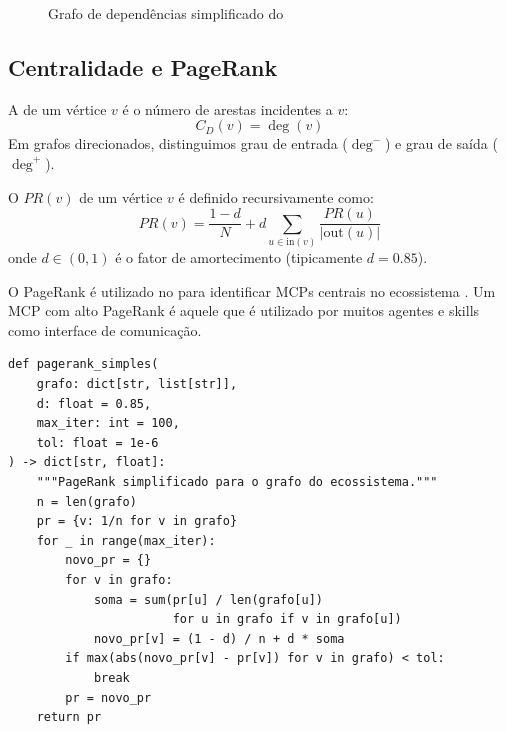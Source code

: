 \begin{figure}[htb]
    \centering
    \caption{Grafo de dependências simplificado do \opencodeeco{}}
    \label{fig:grafo-dependencias}
\end{figure}

\subsection{Centralidade e PageRank}

\begin{definicao}
    A  de um vértice $v$ é o número de
    arestas incidentes a $v$:
    \[
    C_D(v) = \deg(v)
    \]
    Em grafos direcionados, distinguimos grau de entrada ($\deg^-$) e grau
    de saída ($\deg^+$).
\end{definicao}

\begin{definicao}[PageRank]
    O  $PR(v)$ de um vértice $v$ é definido
    recursivamente como:
    \[
    PR(v) = \frac{1-d}{N} + d \sum_{u \in \text{in}(v)}
    \frac{PR(u)}{|\text{out}(u)|}
    \]
    onde $d \in (0,1)$ é o fator de amortecimento (tipicamente $d = 0.85$).
\end{definicao}

\begin{exemplo}
    O PageRank é utilizado no \opencodeeco{} para identificar MCPs centrais
    no ecossistema \cite{opencode2026scanner}. Um MCP com alto PageRank é
    aquele que é utilizado por muitos agentes e skills como interface de
    comunicação.
    \begin{lstlisting}[style=pythonstyle]
def pagerank_simples(
    grafo: dict[str, list[str]],
    d: float = 0.85,
    max_iter: int = 100,
    tol: float = 1e-6
) -> dict[str, float]:
    """PageRank simplificado para o grafo do ecossistema."""
    n = len(grafo)
    pr = {v: 1/n for v in grafo}
    for _ in range(max_iter):
        novo_pr = {}
        for v in grafo:
            soma = sum(pr[u] / len(grafo[u])
                       for u in grafo if v in grafo[u])
            novo_pr[v] = (1 - d) / n + d * soma
        if max(abs(novo_pr[v] - pr[v]) for v in grafo) < tol:
            break
        pr = novo_pr
    return pr
    \end{lstlisting}
\end{exemplo}

